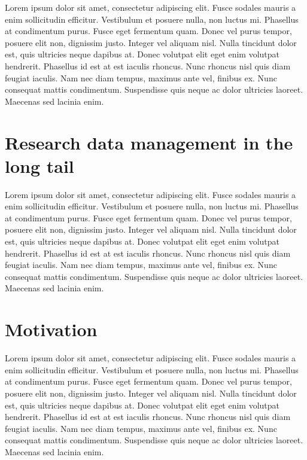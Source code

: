
Lorem ipsum dolor sit amet, consectetur adipiscing elit. Fusce sodales mauris a enim sollicitudin efficitur. Vestibulum et posuere nulla, non luctus mi. Phasellus at condimentum purus. Fusce eget fermentum quam. Donec vel purus tempor, posuere elit non, dignissim justo. Integer vel aliquam nisl. Nulla tincidunt dolor est, quis ultricies neque dapibus at. Donec volutpat elit eget enim volutpat hendrerit. Phasellus id est at est iaculis rhoncus. Nunc rhoncus nisl quis diam feugiat iaculis. Nam nec diam tempus, maximus ante vel, finibus ex. Nunc consequat mattis condimentum. Suspendisse quis neque ac dolor ultricies laoreet. Maecenas sed lacinia enim.


\section{Research data management in the long tail} %
\label{sec:research_data_management_in_the_long_tail}

Lorem ipsum dolor sit amet, consectetur adipiscing elit. Fusce sodales mauris a enim sollicitudin efficitur. Vestibulum et posuere nulla, non luctus mi. Phasellus at condimentum purus. Fusce eget fermentum quam. Donec vel purus tempor, posuere elit non, dignissim justo. Integer vel aliquam nisl. Nulla tincidunt dolor est, quis ultricies neque dapibus at. Donec volutpat elit eget enim volutpat hendrerit. Phasellus id est at est iaculis rhoncus. Nunc rhoncus nisl quis diam feugiat iaculis. Nam nec diam tempus, maximus ante vel, finibus ex. Nunc consequat mattis condimentum. Suspendisse quis neque ac dolor ultricies laoreet. Maecenas sed lacinia enim.


\section{Motivation} %
\label{sec:motivation}

Lorem ipsum dolor sit amet, consectetur adipiscing elit. Fusce sodales mauris a enim sollicitudin efficitur. Vestibulum et posuere nulla, non luctus mi. Phasellus at condimentum purus. Fusce eget fermentum quam. Donec vel purus tempor, posuere elit non, dignissim justo. Integer vel aliquam nisl. Nulla tincidunt dolor est, quis ultricies neque dapibus at. Donec volutpat elit eget enim volutpat hendrerit. Phasellus id est at est iaculis rhoncus. Nunc rhoncus nisl quis diam feugiat iaculis. Nam nec diam tempus, maximus ante vel, finibus ex. Nunc consequat mattis condimentum. Suspendisse quis neque ac dolor ultricies laoreet. Maecenas sed lacinia enim.


